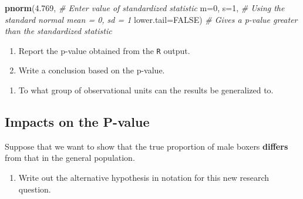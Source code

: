 \documentclass[
]{report}
\newenvironment{Shaded}{\begin{snugshade}}{\end{snugshade}}
\newcommand{\AttributeTok}[1]{\textcolor[rgb]{0.13,0.29,0.53}{#1}}
\newcommand{\CommentTok}[1]{\textcolor[rgb]{0.56,0.35,0.01}{\textit{#1}}}
\newcommand{\ConstantTok}[1]{\textcolor[rgb]{0.56,0.35,0.01}{#1}}
\newcommand{\DecValTok}[1]{\textcolor[rgb]{0.00,0.00,0.81}{#1}}
\newcommand{\FloatTok}[1]{\textcolor[rgb]{0.00,0.00,0.81}{#1}}
\newcommand{\FunctionTok}[1]{\textcolor[rgb]{0.13,0.29,0.53}{\textbf{#1}}}
\newcommand{\NormalTok}[1]{#1}
\providecommand{\tightlist}{%
  \setlength{\itemsep}{0pt}\setlength{\parskip}{0pt}}
\begin{document}
\begin{Shaded}
\begin{Highlighting}[]
\FunctionTok{pnorm}\NormalTok{(}\FloatTok{4.769}\NormalTok{, }\CommentTok{\# Enter value of standardized statistic}
      \AttributeTok{m=}\DecValTok{0}\NormalTok{, }\AttributeTok{s=}\DecValTok{1}\NormalTok{, }\CommentTok{\# Using the standard normal mean = 0, sd = 1}
      \AttributeTok{lower.tail=}\ConstantTok{FALSE}\NormalTok{) }\CommentTok{\# Gives a p{-}value greater than the standardized statistic}
\end{Highlighting}
\end{Shaded}

\begin{enumerate}
\def\labelenumi{\arabic{enumi}.}
\setcounter{enumi}{6}
\item
  Report the p-value obtained from the \texttt{R} output.
  \vspace{0.3in}
\item
  Write a conclusion based on the p-value.
\end{enumerate}

\vspace{0.6in}

\begin{enumerate}
\def\labelenumi{\arabic{enumi}.}
\setcounter{enumi}{8}
\tightlist
\item
  To what group of observational units can the results be generalized to.
\end{enumerate}

\vspace{0.4in}

\subsection*{Impacts on the P-value}\label{impacts-on-the-p-value}

Suppose that we want to show that the true proportion of male boxers \textbf{differs} from that in the general population.

\begin{enumerate}
\def\labelenumi{\arabic{enumi}.}
\setcounter{enumi}{9}
\tightlist
\item
  Write out the alternative hypothesis in notation for this new research question.
\end{enumerate}

\vspace{0.3in}
\end{document}
